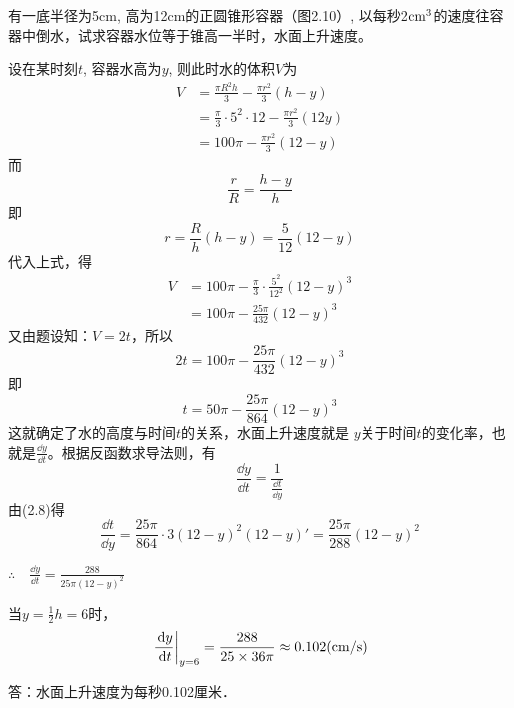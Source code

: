 \begin{example}
有一底半径为5cm, 高为12cm的正圆锥形容器（图2.10）, 以每秒2$\rm cm^3$的速度往容器中倒水，试求容器水位等于锥高一半时，水面上升速度。
\end{example}


\begin{solution}
    设在某时刻$t$, 容器水高为$y$, 则此时水的体积$V$为
 \[\begin{split}
     V&=\frac{\pi R^2h}{3}-\frac{\pi r^2}{3}(h-y)\\
     &=\frac{\pi}{3}\cdot 5^2\cdot 12-\frac{\pi r^2}{3}(12y)\\
     &=100\pi-\frac{\pi r^2}{3}(12-y)
 \end{split}\]
而
\[\frac{r}{R}=\frac{h-y}{h}\]
即
\[r=\frac{R}{h}(h-y)=\frac{5}{12}(12-y)\]
代入上式，得
\[\begin{split}
    V&=100\pi-\frac{\pi}{3}\cdot \frac{5^2}{12^2}(12-y)^3\\
    &=100\pi-\frac{25\pi}{432}(12-y)^3
\end{split}\]
又由题设知：$V=2t$，所以
\[2t=100\pi-\frac{25\pi}{432}(12-y)^3\]
即
\begin{equation}
    t=50\pi-\frac{25\pi}{864}(12-y)^3
\end{equation}
这就确定了水的高度与时间$t$的关系，水面上升速度就是
$y$关于时间$t$的变化率，也就是$\frac{\dd y}{\dd t}$。根据反函数求导法则，有
\[\frac{\dd y}{\dd t}=\frac{1}{\frac{\dd t}{\dd y}}\]
由(2.8)得
\[\frac{\dd t}{\dd y}=\frac{25\pi}{864}\cdot 3(12-y)^2(12-y)'=\frac{25\pi}{288}(12-y)^2\]

$\therefore\quad \frac{\dd y}{\dd t}=\frac{288}{25\pi(12-y)^2}$

当$y=\frac{1}{2}h=6$时，
\[\left.\dfrac{\,{\rm d} y}{\,{\rm d} t}\right|_{y=6}=\dfrac{288}{25\times 36\pi}\approx 0.102({\rm cm/s})\]

答：水面上升速度为每秒0.102厘米．
\end{solution}

